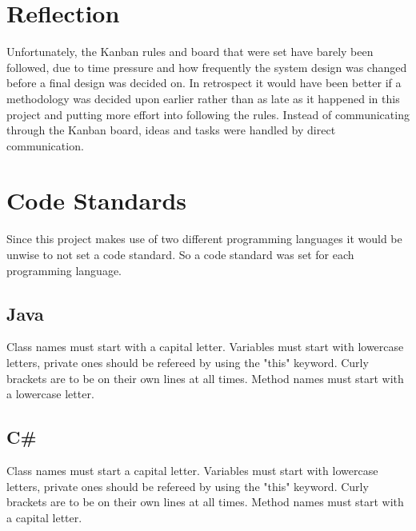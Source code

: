 \section{Reflection}

Unfortunately, the Kanban rules and board that were set have barely been followed, due to time pressure and how frequently the system design was changed before a final design was decided on. In retrospect it would have been better if a methodology was decided upon earlier rather than as late as it happened in this project and putting more effort into following the rules. Instead of communicating through the Kanban board, ideas and tasks were handled by direct communication.

\section{Code Standards}
Since this project makes use of two different programming languages it would be unwise to not set a code standard. So a code standard was set for each programming language.

\subsection{Java}
Class names must start with a capital letter.
Variables must start with lowercase letters, private ones should be refereed by using the "this" keyword.
Curly brackets are to be on their own lines at all times.
Method names must start with a lowercase letter.


\subsection{C\#}
Class names must start a capital letter.
Variables must start with lowercase letters, private ones should be refereed by using the "this" keyword.
Curly brackets are to be on their own lines at all times.
Method names must start with a capital letter.




